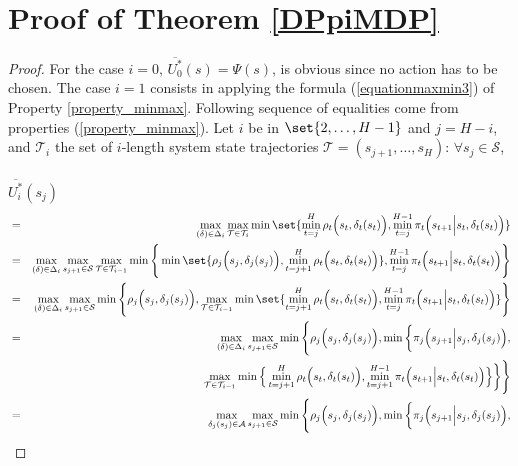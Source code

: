 \section{Proof of Theorem \ref{DPpiMDP}}
\begin{proof}
For the case $i=0$, 
$\overline{U_0^*}(s) = \Psi(s)$, is obvious since no action has to be chosen.
The case $i=1$ consists in applying the formula (\ref{equationmaxmin3}) of Property \ref{property_minmax}.
Following sequence of equalities come from properties (\ref{property_minmax}). 
Let $i$ be in $\set{2, \ldots, H-1}$ and $j=H-i$, 
and $\mathcal{T}_i$ the set of $i$-length system state trajectories $\mathcal{T} = (s_{j+1},\ldots,s_H)$: 
$\forall s_j \in \mathcal{S}$,\\
\\
$\overline{U^*_i}(s_j)$
\vspace{-0.5cm}
\begin{eqnarray}
\nonumber  & = & \displaystyle \max_{(\delta) \in \Delta_i} \max_{\mathcal{T} \in \mathcal{T}_i} \min \set{ \min_{t=j}^{H} \rho_t\Big(s_t,\delta_t(s_t)\Big), \min_{t=j}^{H-1} \pi_t \Big(s_{t+1} \Big\vert s_t , \delta_t(s_t) \Big) } \\
\nonumber & = &  \displaystyle \max_{(\delta) \in \Delta_i} \max_{s_{j+1} \in \mathcal{S}} \max_{\mathcal{T} \in \mathcal{T}_{i-1}} \min \Bigg\{ \min \set{ \rho_{j} \Big( s_{j},\delta_{j}(s_{j}) \Big), \min_{t=j+1}^{H} \rho_{t} \Big(s_t,\delta_t(s_t)\Big)}, \min_{t=j}^{H-1} \pi_t \Big( s_{t+1} \Big\vert s_t , \delta_t(s_t) \Big) \Bigg\} \\
\nonumber & = &  \displaystyle \max_{(\delta) \in \Delta_i} \max_{s_{j+1} \in \mathcal{S}} \min \Bigg\{ \rho_j \Big( s_j,\delta_j(s_j) \Big), \max_{\mathcal{T} \in \mathcal{T}_{i-1}} \min \set{  \min_{t=j+1}^{H} \rho_t \Big(s_t,\delta_t(s_t) \Big), \min_{t=j}^{H-1} \pi_t \Big(s_{t+1} \Big\vert s_t , \delta_t(s_t) \Big) } \Bigg\} \\
\nonumber & = &  \displaystyle \max_{(\delta) \in \Delta_i} \max_{s_{j+1} \in \mathcal{S}} \min \Bigg\{ \rho_j \Big( s_j,\delta_j(s_j) \Big), \min \bigg\{ \pi_j \Big( s_{j+1} \Big\vert s_j, \delta_j(s_j) \Big), \\ 
\nonumber & & \hspace{5cm} \max_{\mathcal{T} \in \mathcal{T}_{i-1}} \min \Big\{  \min_{t=j+1}^{H} \rho_t \Big( s_t,\delta_t(s_t) \Big), \min_{t=j+1}^{H-1} \pi_t \Big( s_{t+1} \Big\vert s_t , \delta_t(s_t) \Big) \Big\} \bigg\} \Bigg\} \\
\nonumber & = &  \displaystyle \max_{\delta_j(s_j) \in \mathcal{A}} \max_{s_{j+1} \in \mathcal{S}} \min \Bigg\{ \rho_j \Big( s_j,\delta_j(s_j) \Big), \min \bigg\{ \pi_j \Big( s_{j+1} \Big\vert s_j, \delta_j(s_j) \Big), \\ 

\end{eqnarray}
\end{proof}
